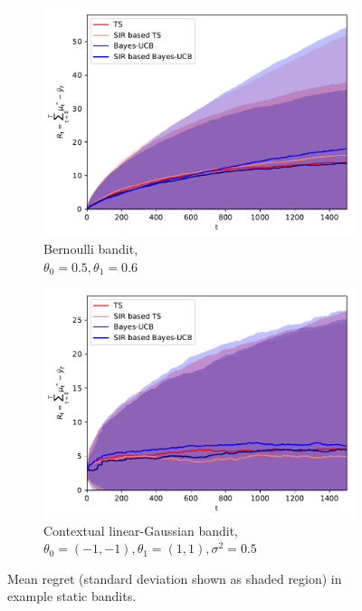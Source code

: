\documentclass{article}
\begin{document}
\begin{figure}[!h]
	\centering
	\begin{subfigure}[b]{0.49\textwidth}
		\includegraphics[width=\textwidth]{./figs/static/bernoulli/cumulative_regret}
		\caption{Bernoulli bandit, \\ $\theta_0=0.5,\theta_1=0.6$}
		\label{fig:static_bandits_bernoulli}
	\end{subfigure}
	\begin{subfigure}[b]{0.49\textwidth}
		\includegraphics[width=\textwidth]{./figs/static/linearGaussian/cumulative_regret_known_sigma}
		\caption{Contextual linear-Gaussian bandit, \\ $\theta_0=(-1,-1),\theta_1=(1,1), \sigma^2=0.5$}
		\label{fig:static_bandits_linearGaussian}
	\end{subfigure}
	\caption{Mean regret (standard deviation shown as shaded region) in example static bandits.}
	\label{fig:static_bandits}
\end{figure}
\end{document}
